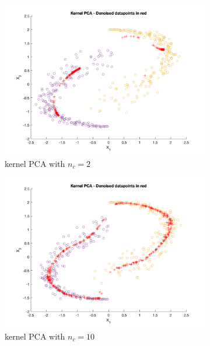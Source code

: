 \documentclass[a4paper, 11pt, one column]{article}
\begin{document}
\begin{figure}[H]
        \begin{subfigure}{0.45\linewidth}
            \includegraphics[width=\linewidth]{images/kernel_pca_2comps.png}
            \caption{kernel PCA with $n_c = 2$}
        \end{subfigure}
        \begin{subfigure}{0.45\linewidth}
            \includegraphics[width=\linewidth]{images/kernel_pca_10comps.png}
            \caption{kernel PCA with $n_c = 10$}
        \end{subfigure}
        \centering
        \begin{subfigure}{0.45\linewidth}

\end{subfigure}
\end{figure}
\end{document}
